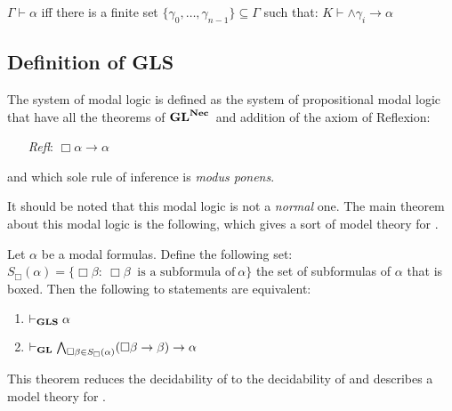 \documentclass[../main.tex]{subfiles}
\begin{document}
\begin{lem}
	$\Gamma\vdash\alpha$ iff there is a finite set
$\{\gamma_0,\ldots,\gamma_{n-1}\}\subseteq \Gamma$ such that:
$K\vdash\wedge\gamma_i\rightarrow\alpha$
\end{lem}

\subsection{Definition of \textbf{GLS}}
\begin{defi}
	The system of modal logic  is defined as the system
	of propositional modal logic that have all the theorems of
	$\text{\textbf{GL}}^{\textbf{Nec}}$\ and
	 addition of the axiom of Reflexion: 
	 \begin{enumerate}
		 \item[\textit{Refl}:]$\Box\alpha\rightarrow\alpha$ 
 	\end{enumerate}
	and which sole rule of inference is \textit{modus ponens}. 
\end{defi}
It should be noted that this modal logic is not a \textit{normal} one.
The main theorem about this modal logic is the following, which gives a sort of
model theory for \GLS.
\begin{thm}
	\label{thm:MainGLS}
	Let $\alpha$ be a modal formulas. Define the following set: $S_\Box(\alpha)=\{\Box\beta:\
	\Box\beta\ \text{ is a subformula of}\ \alpha\}$ the set of
	subformulas of $\alpha$ that is boxed. Then the following to
	statements are equivalent:
	\begin{enumerate}
		\item $\vdash_{\text{\textbf{GLS}}}\alpha$
		\item $\vdash_{\text{\textbf{GL}}}\bigwedge_{\Box\beta\in
			S_\Box(\alpha)}(\Box\beta\rightarrow\beta)\rightarrow\alpha$
	\end{enumerate}
\end{thm}

This theorem reduces the decidability of \GLS to the decidability of \GL and
describes a model theory for \GLS.
\end{document}
